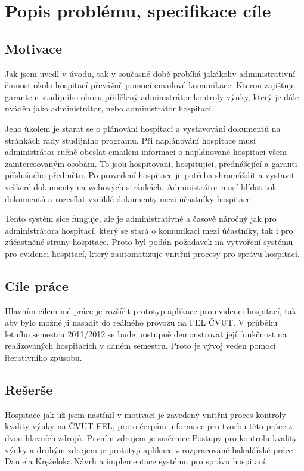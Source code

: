 \chapter{Popis problému, specifikace cíle}
\section{Motivace}
Jak jsem uvedl v úvodu, tak v současné době probíhá jakákoliv administrativní činnost okolo hospitací převážně pomocí emailové komunikace. Kterou zajišťuje garantem studijního oboru přidělený administrátor kontroly výuky, který je dále  uváděn jako administrátor, nebo administrátor hospitací. 

Jeho úkolem je starat se o plánování hospitací a vystavování dokumentů na stránkách rady studijního programu. Při naplánování hospitace musí administrátor ručně obeslat emailem informaci o naplánované hospitaci všem zainteresovaným osobám. To jsou hospitovaní, hospitující, přednášející a garanti příslušného předmětu. Po provedení hospitace je potřeba shromáždit a vystavit veškeré dokumenty na webových stránkách. Administrátor musí hlídat tok dokumentů a rozesílat vzniklé dokumenty mezi účastníky hospitace.

Tento systém sice funguje, ale je administrativně a časově náročný jak pro administrátora hospitací, který se stará o komunikaci mezi účastníky, tak i pro zúčastněné strany hospitace. Proto byl podán požadavek na vytvoření systému pro evidenci hospitací, který zautomatizuje vnitřní procesy pro správu hospitací.

\section{Cíle práce}
Hlavním cílem mé práce je rozšířit prototyp aplikace pro evidenci hospitací, tak aby bylo možné ji nasadit do reálného provozu na FEL ČVUT. V průběhu letního semestru 2011/2012 se bude postupně demonstrovat její funkčnost na realizovaných hospitacích v daném semestru. Proto je vývoj veden pomocí iterativního způsobu.

\section{Rešerše}
Hospitace jak už jsem nastínil v motivaci je zavedený vnitřní proces kontroly kvality výuky na ČVUT FEL, proto čerpám informace pro tvorbu této práce z dvou hlavních zdrojů. Prvním zdrojem je směrnice Postupy pro kontrolu kvality výuky a druhým zdrojem je prototyp aplikace z rozpracované bakalářské práce Daniela Krężeloka Návrh a implementace systému pro správu hospitací.

